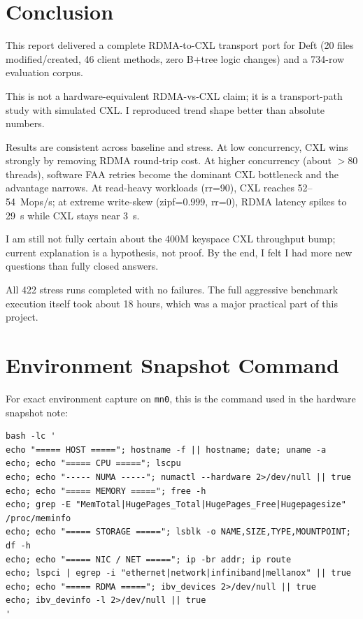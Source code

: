 \documentclass[10pt,twocolumn]{article}
\begin{document}
\section{Conclusion}

This report delivered a complete RDMA-to-CXL transport port for Deft
(20 files modified/created, 46 client methods, zero B+tree logic changes) and
a 734-row evaluation corpus.

This is not a hardware-equivalent RDMA-vs-CXL claim; it is a transport-path
study with simulated CXL.
I reproduced trend shape better than absolute numbers.

Results are consistent across baseline and stress.
At low concurrency, CXL wins strongly by removing RDMA round-trip cost.
At higher concurrency (about $>$80 threads), software FAA retries become the
dominant CXL bottleneck and the advantage narrows.
At read-heavy workloads (rr=90), CXL reaches 52--54~Mops/s; at extreme
write-skew (zipf=0.999, rr=0), RDMA latency spikes to 29~\textmu{}s while CXL
stays near 3~\textmu{}s.

I am still not fully certain about the 400M keyspace CXL throughput bump;
current explanation is a hypothesis, not proof.
By the end, I felt I had more new questions than fully closed answers.

All 422 stress runs completed with no failures.
The full aggressive benchmark execution itself took about 18 hours, which was a
major practical part of this project.

\appendix
\section{Environment Snapshot Command}

For exact environment capture on \texttt{mn0}, this is the command used in the
hardware snapshot note:

\begin{lstlisting}
bash -lc '
echo "===== HOST ====="; hostname -f || hostname; date; uname -a
echo; echo "===== CPU ====="; lscpu
echo; echo "----- NUMA -----"; numactl --hardware 2>/dev/null || true
echo; echo "===== MEMORY ====="; free -h
echo; grep -E "MemTotal|HugePages_Total|HugePages_Free|Hugepagesize" /proc/meminfo
echo; echo "===== STORAGE ====="; lsblk -o NAME,SIZE,TYPE,MOUNTPOINT; df -h
echo; echo "===== NIC / NET ====="; ip -br addr; ip route
echo; lspci | egrep -i "ethernet|network|infiniband|mellanox" || true
echo; echo "===== RDMA ====="; ibv_devices 2>/dev/null || true
echo; ibv_devinfo -l 2>/dev/null || true
'
\end{lstlisting}
\end{document}
